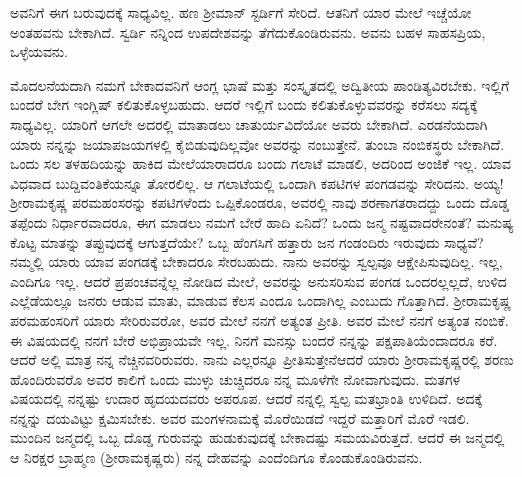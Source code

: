 \enginline{-}ಅವನಿಗೆ ಈಗ ಬರುವುದಕ್ಕೆ ಸಾಧ್ಯವಿಲ್ಲ. ಹಣ ಶ‍್ರೀಮಾನ್ ಸ್ಟರ್ಡಿಗೆ ಸೇರಿದೆ. ಆತನಿಗೆ ಯಾರ ಮೇಲೆ ಇಚ್ಚೆಯೋ ಅಂತಹವನು ಬೇಕಾಗಿದೆ. ಸ್ವರ್ಡಿ ನನ್ನಿಂದ ಉಪದೇಶವನ್ನು ತೆಗೆದುಕೊಂಡಿರುವನು. ಅವನು ಬಹಳ ಸಾಹಸಪ್ರಿಯ, ಒಳ್ಳೆಯವನು.

ಮೊದಲನೆಯದಾಗಿ ನಮಗೆ ಬೇಕಾದವನಿಗೆ ಆಂಗ್ಲ ಭಾಷೆ ಮತ್ತು ಸಂಸ್ಕೃತದಲ್ಲಿ ಅದ್ವಿತೀಯ ಪಾಂಡಿತ್ಯವಿರಬೇಕು. ಇಲ್ಲಿಗೆ ಬಂದರೆ ಬೇಗ ಇಂಗ್ಲಿಷ್ ಕಲಿತುಕೊಳ್ಳಬಹುದು. ಆದರೆ ಇಲ್ಲಿಗೆ ಬಂದು ಕಲಿತುಕೊಳ್ಳುವವರನ್ನು ಕರೆಸಲು ಸದ್ಯಕ್ಕೆ ಸಾಧ್ಯವಿಲ್ಲ. ಯಾರಿಗೆ ಆಗಲೇ ಅದರಲ್ಲಿ ಮಾತಾಡಲು ಚಾತುರ್ಯವಿದೆಯೋ ಅವರು ಬೇಕಾಗಿದೆ. ಎರಡನೆಯದಾಗಿ ಯಾರು ನನ್ನನ್ನು ಜಯಾಪಜಯಗಳಲ್ಲಿ ಕೈಬಿಡುವುದಿಲ್ಲವೋ ಅವರನ್ನು ನಂಬುತ್ತೇನೆ. ತುಂಬಾ ನಂಬಿಕಸ್ಥರು ಬೇಕಾಗಿದೆ. ಒಂದು ಸಲ ತಳಹದಿಯನ್ನು ಹಾಕಿದ ಮೇಲೆ\break ಯಾರಾದರೂ ಬಂದು ಗಲಾಟೆ ಮಾಡಲಿ, ಅದರಿಂದ ಅಂಜಿಕೆ ಇಲ್ಲ.\enginline{-} ಯಾವ ವಿಧವಾದ ಬುದ್ದಿವಂತಿಕೆಯನ್ನೂ ತೋರಲಿಲ್ಲ. ಆ ಗಲಾಟೆಯಲ್ಲಿ ಒಂದಾಗಿ ಕಪಟಿಗಳ ಪಂಗಡವನ್ನು ಸೇರಿದನು. ಅಯ್ಯ! ಶ‍್ರೀರಾಮಕೃಷ್ಣ ಪರಮಹಂಸರನ್ನು ಕಪಟಿಗಳೆಂದು ಒಪ್ಪಿಕೊಂಡರೂ, ಅವರಲ್ಲಿ ನಾವು ಶರಣಾಗತರಾದದ್ದು ಒಂದು ದೊಡ್ಡ ತಪ್ಪೆಂದು ನಿರ್ಧಾರವಾದರೂ, ಈಗ ಮಾಡಲು ನಮಗೆ ಬೇರೆ ಹಾದಿ ಏನಿದೆ? ಒಂದು ಜನ್ಮ ನಷ್ಟವಾದರೇನಂತೆ? ಮನುಷ್ಯ ಕೊಟ್ಟ ಮಾತನ್ನು ತಪ್ಪುವುದಕ್ಕೆ ಆಗುತ್ತದೆಯೇ? ಒಬ್ಬ ಹೆಂಗಸಿಗೆ ಹತ್ತಾರು ಜನ ಗಂಡಂದಿರು ಇರುವುದು ಸಾಧ್ಯವೆ? ನಮ್ಮಲ್ಲಿ ಯಾರು ಯಾವ ಪಂಗಡಕ್ಕೆ ಬೇಕಾದರೂ ಸೇರಬಹುದು. ನಾನು ಅವರನ್ನು ಸ್ವಲ್ಪವೂ ಆಕ್ಷೇಪಿಸುವುದಿಲ್ಲ. ಇಲ್ಲ, ಎಂದಿಗೂ ಇಲ್ಲ. ಆದರೆ ಪ್ರಪಂಚವನ್ನೆಲ್ಲ ನೋಡಿದ ಮೇಲೆ, ಅವರನ್ನು ಅನುಸರಿಸುವ ಪಂಗಡ ಒಂದರಲ್ಲಲ್ಲದೆ, ಉಳಿದ ಎಲ್ಲೆಡೆಯಲ್ಲೂ ಜನರು ಆಡುವ ಮಾತು, ಮಾಡುವ ಕೆಲಸ ಎಂದೂ ಒಂದಾಗಿಲ್ಲ ಎಂಬುದು ಗೊತ್ತಾಗಿದೆ. ಶ‍್ರೀರಾಮಕೃಷ್ಣ ಪರಮಹಂಸರಿಗೆ ಯಾರು ಸೇರಿರುವರೋ, ಅವರ ಮೇಲೆ ನನಗೆ ಅತ್ಯಂತ ಪ್ರೀತಿ. ಅವರ ಮೇಲೆ ನನಗೆ ಅತ್ಯಂತ ನಂಬಿಕೆ. ಈ ವಿಷಯದಲ್ಲಿ ನನಗೆ ಬೇರೆ ಅಭಿಪ್ರಾಯವೇ ಇಲ್ಲ. ನಿನಗೆ ಮನಸ್ಸು ಬಂದರೆ ನನ್ನನ್ನು ಪಕ್ಷ\break ಪಾತಿಯೆಂದಾದರೂ ಕರೆ. ಆದರೆ ಅಲ್ಲಿ ಮಾತ್ರ ನನ್ನ ನೆಚ್ಚಿನವರಿರುವರು. ನಾನು ಎಲ್ಲರನ್ನೂ ಪ್ರೀತಿಸುತ್ತೇನೆ\enginline{-}ಆದರೆ ಯಾರು ಶ‍್ರೀರಾಮಕೃಷ್ಣರಲ್ಲಿ ಶರಣು ಹೊಂದಿರುವರೊ ಅವರ ಕಾಲಿಗೆ ಒಂದು ಮುಳ್ಳು ಚುಚ್ಚಿದರೂ ನನ್ನ ಮೂಳೆಗೇ ನೋವಾಗುವುದು. ಮತಗಳ ವಿಷಯದಲ್ಲಿ ನನ್ನಷ್ಟು ಉದಾರ ಹೃದಯದವರು ಅಪರೂಪ. ಆದರೆ ನನ್ನಲ್ಲಿ ಸ್ವಲ್ಪ ಮತಭ್ರಾಂತಿ ಉಳಿದಿದೆ. ಅದಕ್ಕೆ ನನ್ನನ್ನು ದಯವಿಟ್ಟು ಕ್ಷಮಿಸಬೇಕು. ಅವರ ಮಂಗಳನಾಮಕ್ಕೆ  ಮೊರೆಯಿಡದೆ ಇದ್ದರೆ ಮತ್ತಾರಿಗೆ ಮೊರೆ ಇಡಲಿ. ಮುಂದಿನ ಜನ್ಮದಲ್ಲಿ ಒಬ್ಬ ದೊಡ್ಡ ಗುರುವನ್ನು ಹುಡುಕುವುದಕ್ಕೆ ಬೇಕಾದಷ್ಟು ಸಮಯವಿರುತ್ತದೆ. ಆದರೆ ಈ ಜನ್ಮದಲ್ಲಿ ಆ ನಿರಕ್ಷರ ಬ್ರಾಹ್ಮಣ (ಶ‍್ರೀರಾಮಕೃಷ್ಣರು) ನನ್ನ ದೇಹವನ್ನು ಎಂದೆಂದಿಗೂ ಕೊಂಡುಕೊಂಡಿರುವನು.


